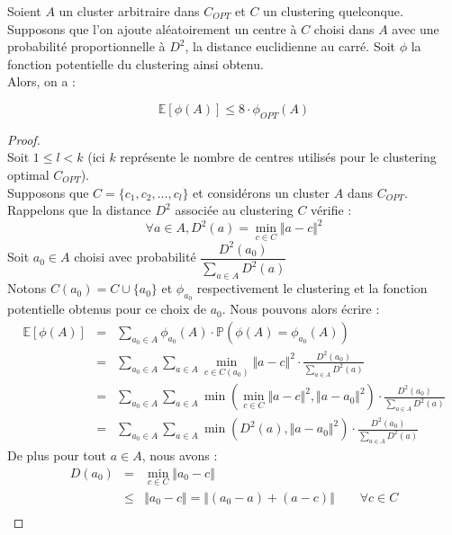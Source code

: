 \documentclass[12pt,a4paper]{book}
\newcommand{\E}{\mathbb{E}}
\newcommand{\p}{\mathbb{P}}
\newcommand{\1}{\mathds{1}}
\begin{document}
\begin{env_lemme}\label{lemme3.2}
		Soient $A$ un cluster arbitraire dans $C_{OPT}$ et $C$ un clustering quelconque. Supposons que l'on ajoute aléatoirement un centre à $C$ choisi dans $A$ avec une probabilité proportionnelle à $D^2$, la distance euclidienne au carré. Soit $\phi$ la fonction potentielle du clustering ainsi obtenu.\\
		Alors, on a :
		
		$$
			\E\left[\phi(A)\right] \leq 8 \cdot \phi_{OPT} \left( A \right)
		$$		
	\end{env_lemme}	
	
	\begin{proof}
		~\\
		Soit $1 \leq l < k$ (ici $k$ représente le nombre de centres utilisés pour le clustering optimal $C_{OPT}$).\\
		Supposons que $C=\{ c_1, c_2, ..., c_l \}$   et considérons un cluster $A$ dans $C_{OPT}$.\\
		Rappelons que la distance $D^2$ associée au clustering $C$ vérifie :
		$$
			\forall a \in A, D^2(a) = \min_{c \in C} \Vert a-c \Vert^2
		$$
		Soit $a_0 \in A$ choisi avec probabilité $\dfrac{D^2(a_0)}{\displaystyle \sum_{a \in A} D^2(a)}$ \\
		Notons $C(a_0) = C \cup \{ a_0 \}$ et $\phi_{a_0}$ respectivement le clustering et la  fonction potentielle obtenus pour ce choix de $a_0$. Nous pouvons alors écrire : 
		\begin{eqnarray*}
			\E\left[\phi(A)\right] &=& \sum_{a_0 \in A} \phi_{a_0}(A) \cdot \p \left( \phi(A)= \phi_{a_0}(A) \right) \\
			&=& \sum_{a_0 \in A} \sum_{a \in A} \min_{c \in C(a_0) }\Vert a-c \Vert^2 \cdot \frac{D^2(a_0)}{ \sum_{a \in A} D^2(a)} \\
			&=&  \sum_{a_0 \in A} \sum_{a \in A} \min \left( \min_{c \in C }\Vert a-c \Vert^2, \Vert a- a_0 \Vert^2 \right) \cdot \frac{D^2(a_0)}{ \sum_{a \in A} D^2(a)} \\
			&=&  \sum_{a_0 \in A} \sum_{a \in A} \min \left( D^2(a), \Vert a-a_0 \Vert^2 \right) \cdot \frac{D^2(a_0)}{ \sum_{a \in A} D^2(a)}  
		\end{eqnarray*}
		De plus pour tout $a \in A$, nous avons : 
		\begin{eqnarray*}
			D(a_0) &=& \min_{c \in C} \Vert a_0 - c \Vert \\
			& \leq &  \Vert a_0 - c \Vert = \Vert (a_0 - a) + (a - c) \Vert \qquad \forall c \in C \\

\end{eqnarray*}
\end{proof}
\end{document}
